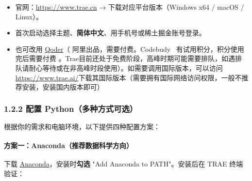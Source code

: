 \documentclass[
  american,
  chinese,
]{ctexart}
\providecommand{\tightlist}{%
  \setlength{\itemsep}{0pt}\setlength{\parskip}{0pt}}
\begin{document}
\begin{itemize}
\tightlist
\item
  {\foreignlanguage{american}{官网：}\foreignlanguage{american}{\url{https://www.trae.cn}}}\foreignlanguage{american}{ → }{\foreignlanguage{american}{下载对应平台版本（}\foreignlanguage{american}{Windows}}\foreignlanguage{american}{ x64 / macOS / Linux}\foreignlanguage{american}{）。}
\item
  {首次启动选择主题、\textbf{简体中文}、用手机号或稀土掘金账号登录。}\foreignlanguage{american}{}
\item
  {也可改用}{ }\foreignlanguage{american}{\href{https://qoder.com}{{Qoder}}}{（}{ }{阿里出品，需要付费。}{\foreignlanguage{american}{Codebudy}}\foreignlanguage{american}{{~ }}{有试用积分，积分使用完后需要付费}{ }{。}\foreignlanguage{american}{Trae}{目前还处于免费阶段，高峰时期可能需要排队，如遇排队请耐心等待或在非高峰时段使用）。如需要调用国际版本，可以访问}\foreignlanguage{american}{\href{https://www.trae.ai/}{{https://www.trae.ai/}}}{下载其国际版本（需要拥有国际网络访问权限，一般不推荐安装，安装国内版本即可）}\foreignlanguage{american}{}
\end{itemize}

\subsubsection{\texorpdfstring{\foreignlanguage{american}{1.2.2 }{配置}\foreignlanguage{american}{ Python}{（多种方式可选）}\foreignlanguage{american}{}}{1.2.2 配置 Python（多种方式可选）}}\label{ux914dux7f6e-pythonux591aux79cdux65b9ux5f0fux53efux9009}

{根据你的需求和电脑环境，以下提供四种配置方案：}\foreignlanguage{american}{}

\paragraph{\texorpdfstring{{\foreignlanguage{american}{方案一：}\foreignlanguage{american}{Anaconda}\foreignlanguage{american}{（推荐数据科学方向}}\foreignlanguage{american}{）}}{方案一：Anaconda（推荐数据科学方向）}}\label{ux65b9ux6848ux4e00anacondaux63a8ux8350ux6570ux636eux79d1ux5b66ux65b9ux5411}

{\foreignlanguage{american}{下载}}\foreignlanguage{american}{ \href{https://www.anaconda.com/download/}{Anaconda}}\foreignlanguage{american}{，安装时\textbf{勾选}}\foreignlanguage{american}{ "Add Anaconda to PATH"}\foreignlanguage{american}{。{安装后在}}\foreignlanguage{american}{ TRAE }{\foreignlanguage{american}{终端验证}}\foreignlanguage{american}{：}
\end{document}
